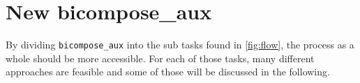 
\section{New bicompose\_aux}

By dividing \texttt{bicompose\_aux} into the sub tasks found in \ref{fig:flow}, the process as a whole should be more accessible. For each of those tasks, many different approaches are feasible and some of those will be discussed in the following.

